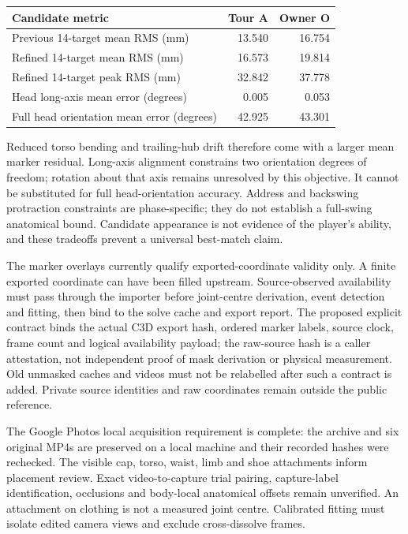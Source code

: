 \documentclass[11pt,a4paper]{article}
\begin{document}
\begin{center}
\begin{tabular}{lrr}
\hline
Candidate metric & Tour A & Owner O \\
\hline
Previous 14-target mean RMS (mm) & 13.540 & 16.754 \\
Refined 14-target mean RMS (mm) & 16.573 & 19.814 \\
Refined 14-target peak RMS (mm) & 32.842 & 37.778 \\
Head long-axis mean error (degrees) & 0.005 & 0.053 \\
Full head orientation mean error (degrees) & 42.925 & 43.301 \\
\hline
\end{tabular}
\end{center}
Reduced torso bending and trailing-hub drift therefore come with a larger
mean marker residual. Long-axis alignment constrains two orientation degrees
of freedom; rotation about that axis remains unresolved by this objective.
It cannot be substituted for full head-orientation accuracy. Address and
backswing protraction constraints are phase-specific; they do not establish
a full-swing anatomical bound. Candidate appearance is not evidence of
the player's ability, and these tradeoffs prevent a universal best-match claim.

The marker overlays currently qualify exported-coordinate validity only.
A finite exported coordinate can have been filled upstream. Source-observed
availability must pass through the importer before joint-centre derivation,
event detection and fitting, then bind to the solve cache and export report.
The proposed explicit contract binds the actual C3D export hash, ordered
marker labels, source clock, frame count and logical availability payload;
the raw-source hash is a caller attestation, not independent proof of mask
derivation or physical measurement. Old unmasked caches and videos must not
be relabelled after such a contract is added. Private source identities and
raw coordinates remain outside the public reference.

The Google Photos local acquisition requirement is complete: the archive
and six original MP4s are preserved on a local machine and their recorded
hashes were rechecked. The visible cap, torso, waist, limb and shoe attachments
inform placement review. Exact video-to-capture trial pairing, capture-label
identification, occlusions and body-local anatomical offsets remain unverified.
An attachment on clothing is not a measured joint centre. Calibrated fitting
must isolate edited camera views and exclude cross-dissolve frames.
\end{document}
